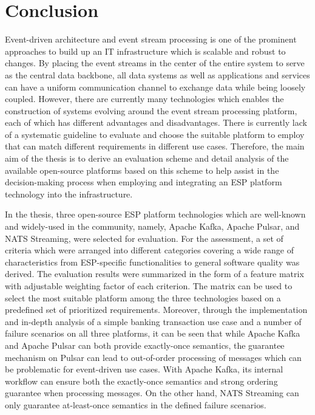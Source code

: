 \chapter{Conclusion}
Event-driven architecture and event stream processing is one of the prominent approaches to build up an IT infrastructure which is scalable and robust to changes. By placing the event streams in the center of the entire system to serve as the central data backbone, all data systems as well as applications and services can have a uniform communication channel to exchange data while being loosely coupled. However, there are currently many technologies which enables the construction of systems evolving around the event stream processing platform, each of which has different advantages and disadvantages. There is currently lack of a systematic guideline to evaluate and choose the suitable platform to employ that can match different requirements in different use cases. Therefore, the main aim of the thesis is to derive an evaluation scheme and detail analysis of the available open-source platforms based on this scheme to help assist in the decision-making process when employing and integrating an ESP platform technology into the infrastructure.

In the thesis, three open-source ESP platform technologies which are well-known and widely-used in the community, namely, Apache Kafka, Apache Pulsar, and NATS Streaming, were selected for evaluation. For the assessment, a set of criteria which were arranged into different categories covering a wide range of characteristics from ESP-specific functionalities to general software quality was derived. The evaluation results were summarized in the form of a feature matrix with adjustable weighting factor of each criterion. The matrix can be used to select the most suitable platform among the three technologies based on a predefined set of prioritized requirements. Moreover, through the implementation and in-depth analysis of a simple banking transaction use case and a number of failure scenarios on all three platforms, it can be seen that while Apache Kafka and Apache Pulsar can both provide exactly-once semantics, the guarantee mechanism on Pulsar can lead to out-of-order processing of messages which can be problematic for event-driven use cases. With Apache Kafka, its internal workflow can ensure both the exactly-once semantics and strong ordering guarantee when processing messages. On the other hand, NATS Streaming can only guarantee at-least-once semantics in the defined failure scenarios.


